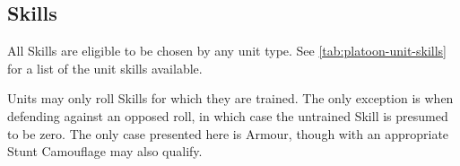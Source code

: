 \subsection{Skills}
\label{sec:platoon-combat-skills}

All Skills are eligible to be chosen by any unit type. See \autoref{tab:platoon-unit-skills} for a list of the unit skills available.



Units may only roll Skills for which they are trained. The only
exception is when defending against an opposed roll, in which case the
untrained Skill is presumed to be zero. The only case presented here
is Armour, though with an appropriate Stunt  Camouflage may also
qualify.

\vfil
